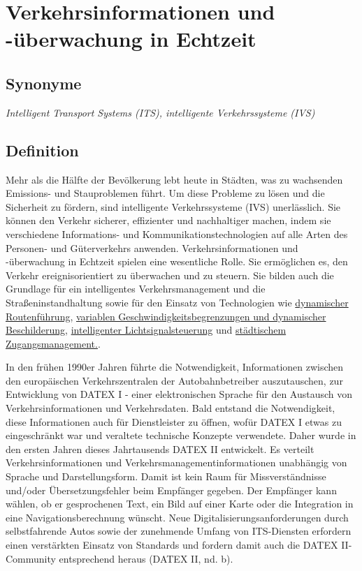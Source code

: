 \documentclass[
]{book}
\begin{document}
\hypertarget{traffic_info_monitoring}{%
\section{Verkehrsinformationen und -überwachung in Echtzeit}\label{traffic_info_monitoring}}

\hypertarget{synonyme-10}{%
\subsection*{Synonyme}\label{synonyme-10}}

\emph{Intelligent Transport Systems (ITS), intelligente Verkehrssysteme (IVS)}

\hypertarget{definition-11}{%
\subsection*{Definition}\label{definition-11}}

Mehr als die Hälfte der Bevölkerung lebt heute in Städten, was zu wachsenden Emissions- und Stauproblemen führt. Um diese Probleme zu lösen und die Sicherheit zu fördern, sind intelligente Verkehrssysteme (IVS) unerlässlich. Sie können den Verkehr sicherer, effizienter und nachhaltiger machen, indem sie verschiedene Informations- und Kommunikationstechnologien auf alle Arten des Personen- und Güterverkehrs anwenden. Verkehrsinformationen und -überwachung in Echtzeit spielen eine wesentliche Rolle. Sie ermöglichen es, den Verkehr ereignisorientiert zu überwachen und zu steuern. Sie bilden auch die Grundlage für ein intelligentes Verkehrsmanagement und die Straßeninstandhaltung sowie für den Einsatz von Technologien wie \protect\hyperlink{dynamic_route}{dynamischer Routenführung}, \protect\hyperlink{variable_speed}{variablen Geschwindigkeitsbegrenzungen und dynamischer Beschilderung}, \protect\hyperlink{adaptive_traffic_control}{intelligenter Lichtsignalsteuerung} und \protect\hyperlink{urban_access}{städtischem Zugangsmanagement.}.

In den frühen 1990er Jahren führte die Notwendigkeit, Informationen zwischen den europäischen Verkehrszentralen der Autobahnbetreiber auszutauschen, zur Entwicklung von DATEX I - einer elektronischen Sprache für den Austausch von Verkehrsinformationen und Verkehrsdaten. Bald entstand die Notwendigkeit, diese Informationen auch für Dienstleister zu öffnen, wofür DATEX I etwas zu eingeschränkt war und veraltete technische Konzepte verwendete. Daher wurde in den ersten Jahren dieses Jahrtausends DATEX II entwickelt. Es verteilt Verkehrsinformationen und Verkehrsmanagementinformationen unabhängig von Sprache und Darstellungsform. Damit ist kein Raum für Missverständnisse und/oder Übersetzungsfehler beim Empfänger gegeben. Der Empfänger kann wählen, ob er gesprochenen Text, ein Bild auf einer Karte oder die Integration in eine Navigationsberechnung wünscht. Neue Digitalisierungsanforderungen durch selbstfahrende Autos sowie der zunehmende Umfang von ITS-Diensten erfordern einen verstärkten Einsatz von Standards und fordern damit auch die DATEX II-Community entsprechend heraus (DATEX II, nd. b).
\end{document}
